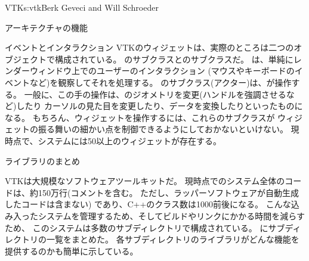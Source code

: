 \begin{aosachapter}{VTK}{s:vtk}{Berk Geveci and Will Schroeder}
\begin{aosasect1}{アーキテクチャの機能}
\begin{aosasect2}{イベントとインタラクション}
VTKのウィジェットは、実際のところは二つのオブジェクトで構成されている。
のサブクラスとのサブクラスだ。
は、単純にレンダーウィンドウ上でのユーザーのインタラクション
(マウスやキーボードのイベントなど)を観察してそれを処理する。
のサブクラス(アクター)は、が操作する。
一般に、この手の操作は、のジオメトリを変更(ハンドルを強調させるなど)したり
カーソルの見た目を変更したり、データを変換したりといったものになる。
もちろん、ウィジェットを操作するには、これらのサブクラスが
ウィジェットの振る舞いの細かい点を制御できるようにしておかないといけない。
現時点で、システムには50以上のウィジェットが存在する。

\end{aosasect2}

\begin{aosasect2}{ライブラリのまとめ}

VTKは大規模なソフトウェアツールキットだ。
現時点でのシステム全体のコードは、約150万行(コメントを含む。
ただし、ラッパーソフトウェアが自動生成したコードは含まない)
であり、C++のクラス数は1000前後になる。
こんな込み入ったシステムを管理するため、そしてビルドやリンクにかかる時間を減らすため、
このシステムは多数のサブディレクトリで構成されている。
にサブディレクトリの一覧をまとめた。
各サブディレクトリのライブラリがどんな機能を提供するのかも簡単に示している。


\end{aosasect2}
\end{aosasect1}
\end{aosachapter}
